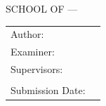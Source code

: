 \begin{titlepage}
  \centering


  \vspace{5mm}
  {\huge\MakeUppercase{School of \getSchool{} --- \getFaculty{}} \par}

  \vspace{5mm}
  {\large\MakeUppercase{\getUniversity{}} \par}

  \vspace{20mm}
  {\Large \getDoctype{} \par}

  \vspace{15mm}
  {\huge\bfseries \getTitle{} \par}


  \vspace{15mm}
  \begin{tabular}{l l}
    Author:           & \getAuthor{}         \\
    Examiner:         & \getSupervisor{}     \\
    Supervisors:      & \getAdvisor{}        \\
                      & \getSecondAdvisor{}  \\
    Submission Date:  & \getSubmissionDate{} \\
  \end{tabular}

\end{titlepage}
